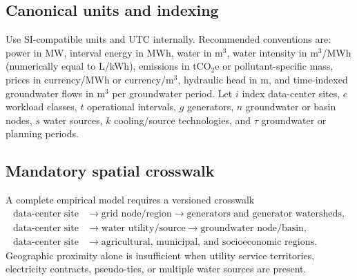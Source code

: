 \documentclass[10pt]{article}
\begin{document}
\subsection{Canonical units and indexing}
Use SI-compatible units and UTC internally. Recommended conventions are: power in MW, interval energy in MWh, water in m$^3$, water intensity in m$^3$/MWh (numerically equal to L/kWh), emissions in tCO$_2$e or pollutant-specific mass, prices in currency/MWh or currency/m$^3$, hydraulic head in m, and time-indexed groundwater flows in m$^3$ per groundwater period. Let $i$ index data-center sites, $c$ workload classes, $t$ operational intervals, $g$ generators, $n$ groundwater or basin nodes, $s$ water sources, $k$ cooling/source technologies, and $\tau$ groundwater or planning periods.

\subsection{Mandatory spatial crosswalk}
A complete empirical model requires a versioned crosswalk
\[
\begin{aligned}
\text{data-center site}
&\rightarrow \text{grid node/region}
\rightarrow \text{generators and generator watersheds},\\
\text{data-center site}
&\rightarrow \text{water utility/source}
\rightarrow \text{groundwater node/basin},\\
\text{data-center site}
&\rightarrow \text{agricultural, municipal, and socioeconomic regions}.
\end{aligned}
\]
Geographic proximity alone is insufficient when utility service territories, electricity contracts, pseudo-ties, or multiple water sources are present.
\end{document}
